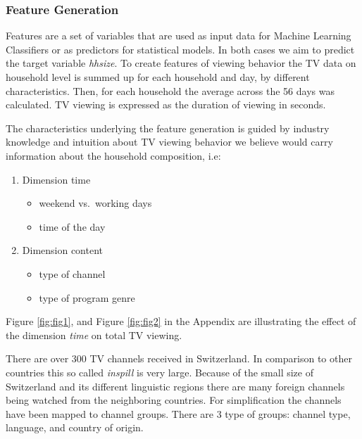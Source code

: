 \documentclass[]{article}
\providecommand{\tightlist}{%
  \setlength{\itemsep}{0pt}\setlength{\parskip}{0pt}}
\begin{document}
\hypertarget{feature-generation}{%
\subsubsection{Feature Generation}\label{feature-generation}}

Features are a set of variables that are used as input data for Machine
Learning Classifiers or as predictors for statistical models. In both
cases we aim to predict the target variable \emph{hhsize}. To create
features of viewing behavior the TV data on household level is summed up
for each household and day, by different characteristics. Then, for each
household the average across the 56 days was calculated. TV viewing is
expressed as the duration of viewing in seconds.

The characteristics underlying the feature generation is guided by
industry knowledge and intuition about TV viewing behavior we believe
would carry information about the household composition, i.e:

\begin{enumerate}
\def\labelenumi{\arabic{enumi}.}
\tightlist
\item
  Dimension time

  \begin{itemize}
  \tightlist
  \item
    weekend vs.~working days
  \item
    time of the day
  \end{itemize}
\item
  Dimension content

  \begin{itemize}
  \tightlist
  \item
    type of channel
  \item
    type of program genre
  \end{itemize}
\end{enumerate}

Figure \ref{fig:fig1}, and Figure \ref{fig:fig2} in the Appendix are
illustrating the effect of the dimension \emph{time} on total TV
viewing.

There are over 300 TV channels received in Switzerland. In comparison to
other countries this so called \emph{inspill} is very large. Because of
the small size of Switzerland and its different linguistic regions there
are many foreign channels being watched from the neighboring countries.
For simplification the channels have been mapped to channel groups.
There are 3 type of groups: channel type, language, and country of
origin.
\end{document}
